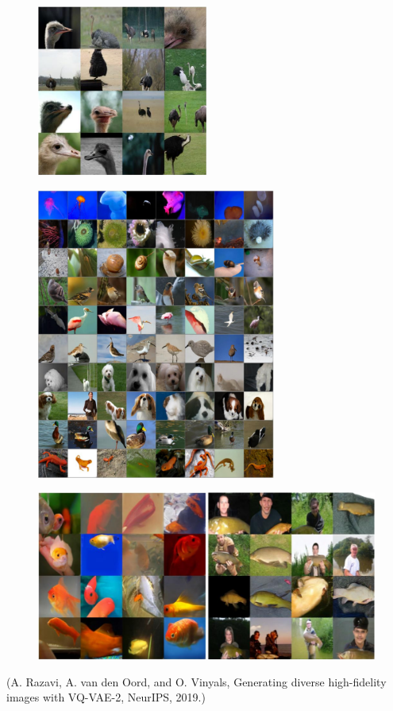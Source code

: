 \documentclass{report}
\begin{document}
\begin{concept}[11.24][VQ-VAE-2]
    \begin{figure}[H]
        \centering
        \includegraphics[width=0.5\textwidth]{.././assets/11.10.png}
    \end{figure}

    \begin{figure}[H]
        \centering
        \includegraphics[width=0.7\textwidth]{.././assets/11.11.png}
    \end{figure}

    \begin{figure}[H]
        \centering
        \includegraphics[width=1.0\textwidth]{.././assets/11.12.png}
    \end{figure}

    (A. Razavi, A. van den Oord, and O. Vinyals, Generating diverse high-fidelity images with VQ-VAE-2, NeurIPS, 2019.)
\end{concept}
\end{document}
